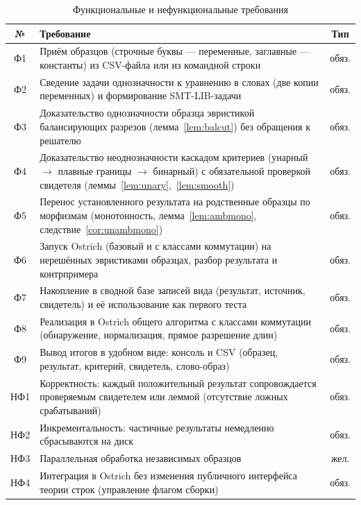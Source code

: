 \documentclass[14pt, russian]{scrartcl}
\begin{document}
\begin{table}[h!]
\caption{Функциональные и нефункциональные требования}
\label{tab:req}
\begin{tabularx}{\textwidth}{|c|X|c|}
\hline
№ & Требование & Тип \\
\hline
Ф1 & Приём образцов (строчные буквы --- переменные, заглавные --- константы) из
     CSV-файла или из командной строки & обяз. \\
\hline
Ф2 & Сведение задачи однозначности к уравнению в словах (две копии переменных) и
     формирование SMT-LIB-задачи & обяз. \\
\hline
Ф3 & Доказательство однозначности образца эвристикой балансирующих разрезов
     (лемма~\ref{lem:balcut}) без обращения к решателю & обяз. \\
\hline
Ф4 & Доказательство неоднозначности каскадом критериев (унарный
     $\to$ плавные границы $\to$ бинарный) с обязательной проверкой свидетеля
     (леммы~\ref{lem:unary},~\ref{lem:smooth}) & обяз. \\
\hline
Ф5 & Перенос установленного результата на родственные образцы по морфизмам
     (монотонность, лемма~\ref{lem:ambmono}, следствие~\ref{cor:unambmono}) & обяз. \\
\hline
Ф6 & Запуск Ostrich (базовый и с классами коммутации) на нерешённых эвристиками
     образцах, разбор результата и контрпримера & обяз. \\
\hline
Ф7 & Накопление в сводной базе записей вида (результат, источник, свидетель) и её
     использование как первого теста & обяз. \\
\hline
Ф8 & Реализация в Ostrich общего алгоритма с классами коммутации (обнаружение,
     нормализация, прямое разрешение длин) & обяз. \\
\hline
Ф9 & Вывод итогов в удобном виде: консоль и CSV (образец, результат, критерий,
     свидетель, слово-образ) & обяз. \\
\hline
НФ1 & Корректность: каждый положительный результат сопровождается проверяемым
      свидетелем или леммой (отсутствие ложных срабатываний) & обяз. \\
\hline
НФ2 & Инкрементальность: частичные результаты немедленно сбрасываются на диск & обяз. \\
\hline
НФ3 & Параллельная обработка независимых образцов & жел. \\
\hline
НФ4 & Интеграция в Ostrich без изменения публичного интерфейса теории строк
      (управление флагом сборки) & обяз. \\
\hline
\end{tabularx}
\end{table}
\end{document}
